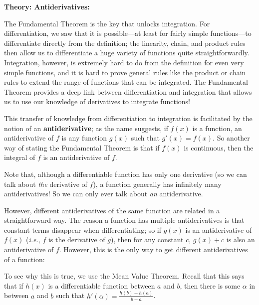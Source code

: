 \documentclass{article}
\begin{document}
\clearpage




\textbf{Theory: Antiderivatives:}\bigskip


The Fundamental Theorem is the key that unlocks integration. For differentiation, we saw that it is possible---at least for fairly simple functions---to differentiate directly from the definition; the linearity, chain, and product rules then allow us to differentiate a huge variety of functions quite straightforwardly. Integration, however, is extremely hard to do from the definition for even very simple functions, and it is hard to prove general rules like the product or chain rules to extend the range of functions that can be integrated. The Fundamental Theorem provides a deep link between differentiation and integration that allows us to use our knowledge of derivatives to integrate functions!

This transfer of knowledge from differentiation to integration is facilitated by the notion of an \textbf{antiderivative}; as the name suggests, if $f(x)$ is a function, an antiderivative of $f$ is any function $g(x)$ such that $g'(x)=f(x)$. So another way of stating the Fundamental Theorem is that if $f(x)$ is continuous, then the integral of $f$ is an antiderivative of $f$.

Note that, although a differentiable function has only one derivative (so we can talk about \textit{the} derivative of $f$), a function generally has infinitely many antiderivatives! So we can only ever talk about \textit{an} antiderivative.

However, different antiderivatives of the same function are related in a straightforward way. The reason a function has multiple antiderivatives is that constant terms disappear when differentiating; so if $g(x)$ is an antiderivative of $f(x)$ (\textit{i.e.}, $f$ is the derivative of $g$), then for any constant $c$, $g(x)+c$ is also an antiderivative of $f$. However, this is the only way to get different antiderivatives of a function:\bigskip

\noindent{}\bigskip

To see why this is true, we use the Mean Value Theorem. Recall that this says that if $h(x)$ is a differentiable function between $a$ and $b$, then there is some $\alpha$ in between $a$ and $b$ such that $h'(\alpha)=\frac{h(b)-h(a)}{b-a}$.
\end{document}
